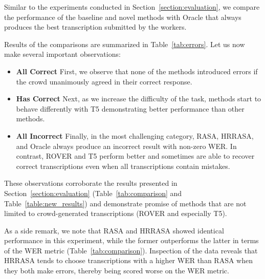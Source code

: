 \documentclass{article}
\begin{document}
Similar to the experiments conducted in Section~\ref{section:evaluation}, we compare the performance of the baseline and novel methods with Oracle that always produces the best transcription submitted by the workers.

Results of the comparisons are summarized in Table~\ref{tab:errors}. Let us now make several important observations:
\begin{itemize}[itemsep=0pt, leftmargin=15pt, topsep=0pt]
    \item  \textbf{All Correct} First, we observe that none of the methods introduced errors if the crowd unanimously agreed in their correct response. 
    
    \item  \textbf{Has Correct} Next, as we increase the difficulty of the task, methods start to behave differently with T5 demonstrating better performance than other methods.
    
    \item \textbf{All Incorrect} Finally, in the most challenging category, RASA, HRRASA, and Oracle always produce an incorrect result with non-zero WER. In contrast, ROVER and T5 perform better and sometimes are able to recover correct transcriptions even when all transcriptions contain mistakes.
\end{itemize}

These observations corroborate the results presented in Section~\ref{section:evaluation} (Table~\ref{tab:comparison} and Table~\ref{table:new_results}) and demonstrate promise of methods that are not limited to crowd-generated transcriptions (ROVER and especially T5). 

As a side remark, we note that RASA and HRRASA showed identical performance in this experiment, while the former outperforms the latter in terms of the WER metric (Table~\ref{tab:comparison}). Inspection of the data reveals that HRRASA tends to choose transcriptions with a higher WER than RASA when they both make errors, thereby being scored worse on the WER metric.
\end{document}
